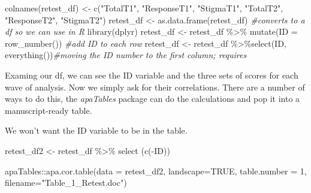 \documentclass[
  english,
]{book}
\newenvironment{Shaded}{\begin{snugshade}}{\end{snugshade}}
\newcommand{\AttributeTok}[1]{\textcolor[rgb]{0.77,0.63,0.00}{#1}}
\newcommand{\CommentTok}[1]{\textcolor[rgb]{0.56,0.35,0.01}{\textit{#1}}}
\newcommand{\ConstantTok}[1]{\textcolor[rgb]{0.00,0.00,0.00}{#1}}
\newcommand{\DecValTok}[1]{\textcolor[rgb]{0.00,0.00,0.81}{#1}}
\newcommand{\FunctionTok}[1]{\textcolor[rgb]{0.00,0.00,0.00}{#1}}
\newcommand{\NormalTok}[1]{#1}
\newcommand{\OtherTok}[1]{\textcolor[rgb]{0.56,0.35,0.01}{#1}}
\newcommand{\SpecialCharTok}[1]{\textcolor[rgb]{0.00,0.00,0.00}{#1}}
\newcommand{\StringTok}[1]{\textcolor[rgb]{0.31,0.60,0.02}{#1}}
\begin{document}
\begin{Shaded}
\begin{Highlighting}[]
\FunctionTok{colnames}\NormalTok{(retest\_df) }\OtherTok{\textless{}{-}} \FunctionTok{c}\NormalTok{(}\StringTok{"TotalT1"}\NormalTok{, }\StringTok{"ResponseT1"}\NormalTok{, }\StringTok{"StigmaT1"}\NormalTok{, }\StringTok{"TotalT2"}\NormalTok{, }\StringTok{"ResponseT2"}\NormalTok{, }\StringTok{"StigmaT2"}\NormalTok{)}
\NormalTok{retest\_df  }\OtherTok{\textless{}{-}} \FunctionTok{as.data.frame}\NormalTok{(retest\_df) }\CommentTok{\#converts to a df so we can use in R}
\FunctionTok{library}\NormalTok{(dplyr)}
\NormalTok{retest\_df }\OtherTok{\textless{}{-}}\NormalTok{ retest\_df }\SpecialCharTok{\%\textgreater{}\%} \FunctionTok{mutate}\NormalTok{(}\AttributeTok{ID =} \FunctionTok{row\_number}\NormalTok{()) }\CommentTok{\#add ID to each row}
\NormalTok{retest\_df }\OtherTok{\textless{}{-}}\NormalTok{ retest\_df }\SpecialCharTok{\%\textgreater{}\%}\FunctionTok{select}\NormalTok{(ID, }\FunctionTok{everything}\NormalTok{())}\CommentTok{\#moving the ID number to the first column; requires}
\end{Highlighting}
\end{Shaded}

Examing our df, we can see the ID variable and the three sets of scores for each wave of analysis. Now we simply ask for their correlations. There are a number of ways to do this, the \emph{apaTables} package can do the calculations and pop it into a manuscript-ready table.

We won't want the ID variable to be in the table.

\begin{Shaded}
\begin{Highlighting}[]
\NormalTok{retest\_df2 }\OtherTok{\textless{}{-}}\NormalTok{ retest\_df }\SpecialCharTok{\%\textgreater{}\%}
  \FunctionTok{select}\NormalTok{ (}\FunctionTok{c}\NormalTok{(}\SpecialCharTok{{-}}\NormalTok{ID))}
\end{Highlighting}
\end{Shaded}

\begin{Shaded}
\begin{Highlighting}[]
\NormalTok{apaTables}\SpecialCharTok{::}\FunctionTok{apa.cor.table}\NormalTok{(}\AttributeTok{data =}\NormalTok{ retest\_df2, }\AttributeTok{landscape=}\ConstantTok{TRUE}\NormalTok{, }\AttributeTok{table.number =} \DecValTok{1}\NormalTok{, }\AttributeTok{filename=}\StringTok{"Table\_1\_Retest.doc"}\NormalTok{)}
\end{Highlighting}
\end{Shaded}
\end{document}
